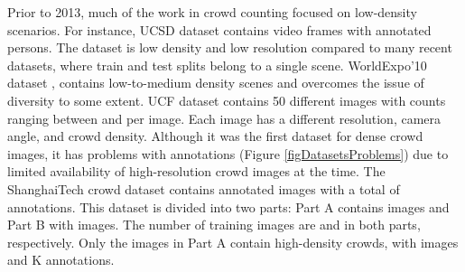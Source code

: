 \documentclass[runningheads]{llncs}
\begin{document}
Prior to 2013, much of the work in crowd counting focused on low-density scenarios. For instance, UCSD dataset \cite{vasconcelos-cvpr08} contains  video frames with  annotated persons. The dataset is low density and low resolution compared to many recent datasets, where train and test splits belong to a single scene. WorldExpo'10 dataset \cite{zhang2015cross}, contains  low-to-medium density scenes and overcomes the issue of diversity to some extent. UCF dataset \cite{idrees2013multi} contains 50 different images with counts ranging between  and  per image. Each image has a different resolution, camera angle, and crowd density. Although it was the first dataset for dense crowd images, it has problems with annotations (Figure \ref{figDatasetsProblems}) due to limited availability of high-resolution crowd images at the time. The ShanghaiTech crowd dataset \cite{zhang2016single} contains  annotated images with a total of  annotations. This dataset is divided into two parts: Part A contains  images and Part B with  images. The number of training images are  and  in both parts, respectively. Only the images in Part A contain high-density crowds, with  images and K annotations.

\renewcommand{\multirowsetup}{\centering}
\begin{table*}[t]
\centering
\caption{{Summary of statistics of different datasets. UCF\_CC\_50 (44MB); WorldExpo'10 (325MB); ShanghaiTech\_A (67MB); and the proposed UCF-QNRF Dataset (4.33GB).}}
\label{tabDatasets}
\end{table*}
\end{document}
